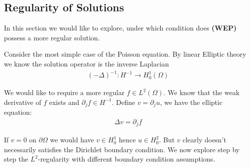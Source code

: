 \documentclass[a4paper,11pt,oneside,fleqn]{book}
\theoremstyle{definition}
\theoremstyle{remark}
\begin{document}
\subsection{Regularity of Solutions}
In this section we would like to explore, under which condition does \textbf{(WEP)} possess a more regular solution. \par 
Consider the most simple case of the Poisson equation. By linear Elliptic theory we know the solution operator is the inverse Laplacian 
\begin{align*}
	(-\Delta)^{-1}: H^{-1} \rightarrow H_0^1(\Omega)
\end{align*}

We would like to require a more regular $ f \in L^2(\Omega)$. We know that the weak derivative of $f$ exists and $\partial_j f \in H^{-1}$. Define $v = \partial_j u$, we have the elliptic equation:
\begin{align*}
	\Delta v = \partial_j f
\end{align*} 

If $v = 0$ on $\partial\Omega$ we would have $v \in H_0^1$ hence $u \in H^2_0$. But $v$ clearly doesn't necessarily satisfies the Dirichlet boundary condition. We now explore step by step the $L^2$-regularity with different boundary condition assumptions.\par
\end{document}
